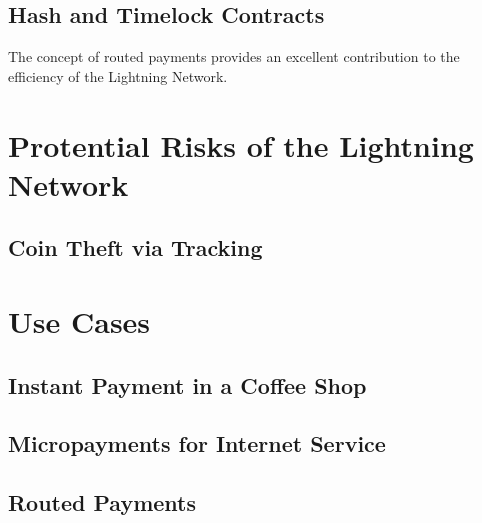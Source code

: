 \documentclass[a4paper, 12pt]{report}
\begin{document}
\section{Hash and Timelock Contracts}
\par The concept of routed payments provides an excellent contribution to the efficiency of the Lightning Network.

\chapter{Protential Risks of the Lightning Network}
\section{Coin Theft via Tracking}

\chapter{Use Cases}
\section{Instant Payment in a Coffee Shop}
\section{Micropayments for Internet Service}
\section{Routed Payments}
\end{document}
